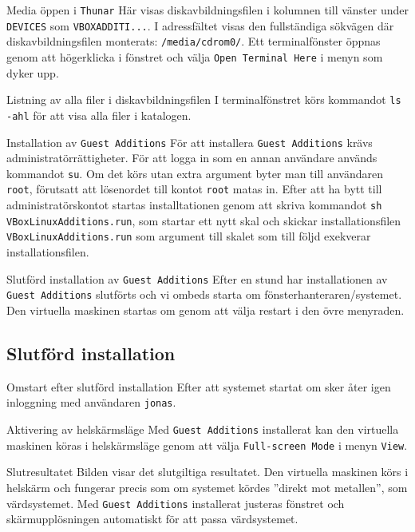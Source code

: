            {Media öppen i \texttt{Thunar}}
           {Här visas diskavbildningsfilen i kolumnen till vänster under
            \texttt{DEVICES} som \texttt{VBOXADDITI...}. I adressfältet visas
            den fullständiga sökvägen där diskavbildningsfilen monterats:
            \texttt{/media/cdrom0/}. Ett terminalfönster öppnas genom att
            högerklicka i fönstret och välja \texttt{Open Terminal Here} i
            menyn som dyker upp.}
           {}

           {Listning av alla filer i diskavbildningsfilen}
           {I terminalfönstret körs kommandot \texttt{ls -ahl} för att visa
            alla filer i katalogen.}
           {}

           {Installation av \texttt{Guest Additions}}
           {För att installera \texttt{Guest Additions} krävs
            administratörrättigheter. För att logga in som en annan användare
            används kommandot \texttt{su}. Om det körs utan extra argument 
            byter man till användaren \texttt{root}, förutsatt att lösenordet
            till kontot \texttt{root} matas in. Efter att ha bytt till
            administratörskontot startas installtationen genom att skriva
            kommandot \texttt{sh VBoxLinuxAdditions.run}, som startar ett nytt
            skal och skickar installationsfilen \texttt{VBoxLinuxAdditions.run}
            som argument till skalet som till följd exekverar installationsfilen.}
           {}

           {Slutförd installation av \texttt{Guest Additions}}
           {Efter en stund har installationen av \texttt{Guest Additions}
            slutförts och vi ombeds starta om fönsterhanteraren/systemet.
            Den virtuella maskinen startas om genom att välja restart i 
            den övre menyraden.}
           {}


\subsection{Slutförd installation}

           {Omstart efter slutförd installation}
           {Efter att systemet startat om sker åter igen inloggning med
            användaren \texttt{jonas}.}
           {}

           {Aktivering av helskärmsläge}
           {Med \texttt{Guest Additions} installerat kan den virtuella maskinen
            köras i helskärmsläge genom att välja \texttt{Full-screen Mode} i
            menyn \texttt{View}.}
           {}

           {Slutresultatet}
           {Bilden visar det slutgiltiga resultatet. Den virtuella maskinen
            körs i helskärm och fungerar precis som om systemet kördes
            ''direkt mot metallen'', som värdsystemet.
            Med \texttt{Guest Additions} installerat justeras fönstret och
            skärmupplösningen automatiskt för att passa värdsystemet.}
           {}

